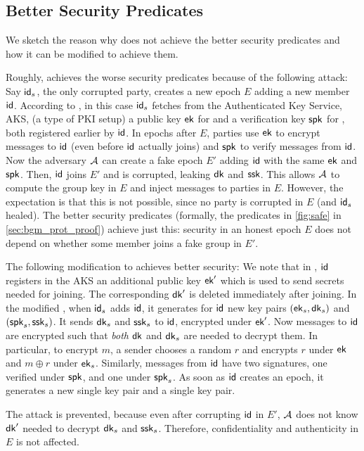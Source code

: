 \subsection{Better Security Predicates}\label{sec:ext-sec-predicates}
We sketch the reason why \saik does not achieve the better security predicates and how it can be modified to achieve them.

Roughly, \saik achieves the worse security predicates because of the following attack: Say ${\mathsf{id}}_s$, the only corrupted party, creates a new epoch $E$ adding a new member ${\mathsf{id}}$. According to \saik, in this case ${\mathsf{id}}_s$ fetches from the Authenticated Key Service, AKS, (a type of PKI setup) a public key ${\mathsf{ek}}$ for \mmPKE and a verification key ${\mathsf{spk}}$ for \sigscheme, both registered earlier by ${\mathsf{id}}$. In epochs after $E$, parties use ${\mathsf{ek}}$ to encrypt messages to ${\mathsf{id}}$ (even before ${\mathsf{id}}$ actually joins) and ${\mathsf{spk}}$ to verify messages from ${\mathsf{id}}$. Now the adversary $\mathcal{A}_{\relax}$ can create a fake epoch $E'$ adding ${\mathsf{id}}$ with the same ${\mathsf{ek}}$ and ${\mathsf{spk}}$. Then, ${\mathsf{id}}$ joins $E'$ and is corrupted, leaking ${\mathsf{dk}}$ and ${\mathsf{ssk}}$. This allows $\mathcal{A}_{\relax}$ to compute the group key in $E$ and inject messages to parties in $E$. However, the expectation is that this is not possible, since no party is corrupted in $E$ (and ${\mathsf{id}}_s$ healed).
%
The better security predicates (formally, the predicates in \cref{fig:safe} in \cref{sec:bgm_prot_proof}) achieve just this: security in an honest epoch $E$ does not depend on whether some member joins a fake group in $E'$.

The following modification to \saik achieves better security: We note that in \saik, ${\mathsf{id}}$ registers in the AKS an additional public key ${\mathsf{ek}}'$ which is used to send secrets needed for joining. The corresponding ${\mathsf{dk}}'$ is deleted immediately after joining. In the modified \saik, when ${\mathsf{id}}_s$ adds ${\mathsf{id}}$, it generates for ${\mathsf{id}}$ new key pairs $({\mathsf{ek}}_s,{\mathsf{dk}}_s)$ and $({\mathsf{spk}}_s,{\mathsf{ssk}}_s)$. It sends ${\mathsf{dk}}_s$ and ${\mathsf{ssk}}_s$ to ${\mathsf{id}}$, encrypted under ${\mathsf{ek}}'$. Now messages to ${\mathsf{id}}$ are encrypted such that \emph{both} ${\mathsf{dk}}$ and ${\mathsf{dk}}_s$ are needed to decrypt them. In particular, to encrypt $m$, a sender chooses a random $r$ and encrypts $r$ under ${\mathsf{ek}}$ and $m \oplus r$ under ${\mathsf{ek}}_s$. Similarly, messages from ${\mathsf{id}}$ have two signatures, one verified under ${\mathsf{spk}}$, and one under ${\mathsf{spk}}_s$. As soon as ${\mathsf{id}}$ creates an epoch, it generates a new single \mmPKE key pair and a single \ers key pair.

The attack is prevented, because even after corrupting ${\mathsf{id}}$ in $E'$, $\mathcal{A}_{\relax}$ does not know ${\mathsf{dk}}'$ needed to decrypt ${\mathsf{dk}}_s$ and ${\mathsf{ssk}}_s$. Therefore, confidentiality and authenticity in $E$ is not affected.

